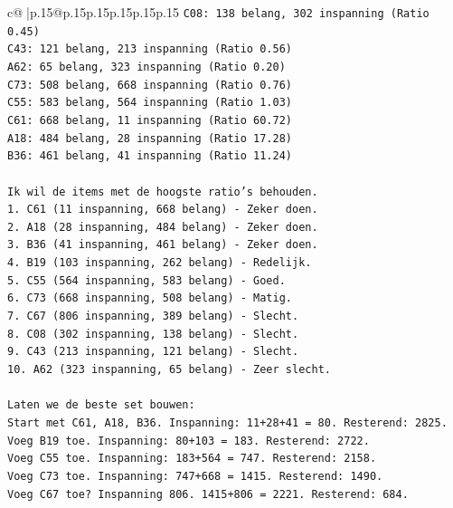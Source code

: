 \documentclass{article}
\begin{document}
{\begin{supertabular}{c@{$\;$}|p{.15\linewidth}@{}p{.15\linewidth}p{.15\linewidth}p{.15\linewidth}p{.15\linewidth}p{.15\linewidth}}
{{{\texttt{C08: 138 belang, 302 inspanning (Ratio 0.45)} \\
\texttt{C43: 121 belang, 213 inspanning (Ratio 0.56)} \\
\texttt{A62: 65 belang, 323 inspanning (Ratio 0.20)} \\
\texttt{C73: 508 belang, 668 inspanning (Ratio 0.76)} \\
\texttt{C55: 583 belang, 564 inspanning (Ratio 1.03)} \\
\texttt{C61: 668 belang, 11 inspanning (Ratio 60.72)} \\
\texttt{A18: 484 belang, 28 inspanning (Ratio 17.28)} \\
\texttt{B36: 461 belang, 41 inspanning (Ratio 11.24)} \\
\\ 
\texttt{Ik wil de items met de hoogste ratio's behouden.} \\
\texttt{1. C61 (11 inspanning, 668 belang) {-} Zeker doen.} \\
\texttt{2. A18 (28 inspanning, 484 belang) {-} Zeker doen.} \\
\texttt{3. B36 (41 inspanning, 461 belang) {-} Zeker doen.} \\
\texttt{4. B19 (103 inspanning, 262 belang) {-} Redelijk.} \\
\texttt{5. C55 (564 inspanning, 583 belang) {-} Goed.} \\
\texttt{6. C73 (668 inspanning, 508 belang) {-} Matig.} \\
\texttt{7. C67 (806 inspanning, 389 belang) {-} Slecht.} \\
\texttt{8. C08 (302 inspanning, 138 belang) {-} Slecht.} \\
\texttt{9. C43 (213 inspanning, 121 belang) {-} Slecht.} \\
\texttt{10. A62 (323 inspanning, 65 belang) {-} Zeer slecht.} \\
\\ 
\texttt{Laten we de beste set bouwen:} \\
\texttt{Start met C61, A18, B36. Inspanning: 11+28+41 = 80. Resterend: 2825.} \\
\texttt{Voeg B19 toe. Inspanning: 80+103 = 183. Resterend: 2722.} \\
\texttt{Voeg C55 toe. Inspanning: 183+564 = 747. Resterend: 2158.} \\
\texttt{Voeg C73 toe. Inspanning: 747+668 = 1415. Resterend: 1490.} \\
\texttt{Voeg C67 toe? Inspanning 806. 1415+806 = 2221. Resterend: 684.} \\
}}}
\end{supertabular}}
\end{document}
